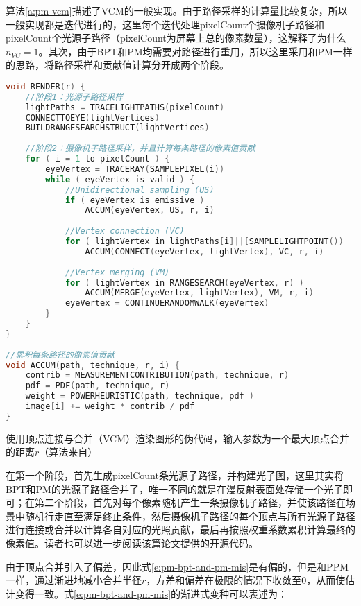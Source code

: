 算法\ref{a:pm-vcm}描述了VCM的一般实现。由于路径采样的计算量比较复杂，所以一般实现都是迭代进行的，这里每个迭代处理pixelCount个摄像机子路径和pixelCount个光源子路径（pixelCount为屏幕上总的像素数量），这解释了为什么$n_{VC}=1$。其次，由于BPT和PM均需要对路径进行重用，所以这里采用和PM一样的思路，将路径采样和贡献值计算分开成两个阶段。

\begin{algorithm}
\begin{lstlisting}[language=C++, mathescape]
void RENDER(r) {
	//阶段1：光源子路径采样
	lightPaths = TRACELIGHTPATHS(pixelCount) 
	CONNECTTOEYE(lightVertices) 
	BUILDRANGESEARCHSTRUCT(lightVertices)
	
	//阶段2：摄像机子路径采样，并且计算每条路径的像素值贡献
	for ( i = 1 to pixelCount ) {
		eyeVertex = TRACERAY(SAMPLEPIXEL(i)) 
		while ( eyeVertex is valid ) {
			//Unidirectional sampling (US) 
			if ( eyeVertex is emissive )
				ACCUM(eyeVertex, US, r, i) 
			
			//Vertex connection (VC)
			for ( lightVertex in lightPaths[i]||[SAMPLELIGHTPOINT()) 
				ACCUM(CONNECT(eyeVertex, lightVertex), VC, r, i) 
		
			//Vertex merging (VM)
			for ( lightVertex in RANGESEARCH(eyeVertex, r) )
				ACCUM(MERGE(eyeVertex, lightVertex), VM, r, i) 
			eyeVertex = CONTINUERANDOMWALK(eyeVertex) 
		}
	}
}
		
//累积每条路径的像素值贡献
void ACCUM(path, technique, r, i) {
	contrib = MEASUREMENTCONTRIBUTION(path, technique, r) 
	pdf = PDF(path, technique, r)
	weight = POWERHEURISTIC(path, technique, pdf )
	image[i] += weight * contrib / pdf
}
\end{lstlisting}
\caption{使用顶点连接与合并（VCM）渲染图形的伪代码，输入参数为一个最大顶点合并的距离$r$（算法来自\cite{a:LightTransportSimulationwithVertexConnectionandMerging}）}
\label{a:pm-vcm}
\end{algorithm}

在第一个阶段，首先生成pixelCount条光源子路径，并构建光子图，这里其实将BPT和PM的光源子路径合并了，唯一不同的就是在漫反射表面处存储一个光子即可；在第二个阶段，首先对每个像素随机产生一条摄像机子路径，并使该路径在场景中随机行走直至满足终止条件，然后摄像机子路径的每个顶点与所有光源子路径进行连接或合并以计算各自对应的光照贡献，最后再按照权重系数累积计算最终的像素值。读者也可以进一步阅读该篇论文提供的开源代码\cite{m:SmallVCM}。

由于顶点合并引入了偏差，因此式\ref{e:pm-bpt-and-pm-mis}是有偏的，但是和PPM一样，通过渐进地减小合并半径$r$，方差和偏差在极限的情况下收敛至0，从而使估计变得一致。式\ref{e:pm-bpt-and-pm-mis}的渐进式变种可以表述为：

